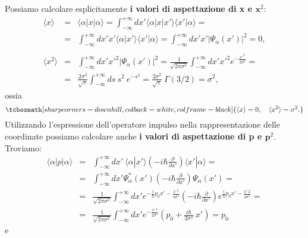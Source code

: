 Possiamo calcolare esplicitamente \textbf{i valori di aspettazione di x e $\mathbf x^2$}:
	\begin{eqnarray}
		\langle x \rangle &=& \langle \alpha | x | \alpha \rangle = \int_{-\infty}^{+\infty} dx' \langle \alpha | x | x' \rangle \langle x' | \alpha \rangle =  \nonumber \\
		&=&  \int_{-\infty}^{+\infty} dx' x' \langle \alpha | x' \rangle \langle x' | \alpha \rangle = \int_{-\infty}^{+\infty} dx' x' |\Psi_\alpha (x')|^2 = 0,\\
		\nonumber \\
		\langle x^2 \rangle &=&  \int_{-\infty}^{+\infty} dx' x'^2 |\Psi_\alpha (x')|^2 = \frac{1}{\sqrt{2 \pi \sigma^2}} \int_{-\infty}^{+\infty} dx' x'^2 e^{- \frac{x'^2}{2 \sigma^2}} =\nonumber  \\
		&=& \frac{2 \sigma^2}{\sqrt{\pi}} \int_{-\infty}^{+\infty} ds ~ s^2 ~e^{-s^2} = \frac{2 \sigma^2}{\sqrt{\pi}} ~ \Gamma(3/2) = \sigma^2,
	\end{eqnarray}
ossia
	\begin{equation}
		\tcboxmath[sharp corners=downhill, colback=white, colframe=black]{
			\langle x \rangle = 0, \quad \langle x^2 \rangle = \sigma^2.
			}
	\end{equation}
Utilizzando l'espressione dell'operatore impulso nella rappresentazione delle coordinate possiamo calcolare anche \textbf{i valori di aspettazione di p e $\mathbf p^2$}. Troviamo:
	\begin{eqnarray}
		\langle \alpha | p | \alpha \rangle  &=&  \int_{-\infty}^{+\infty} dx'\ \langle \alpha | x' \rangle \left(-i \hbar \frac{\partial}{\partial x'} \right) \langle x' | \alpha \rangle = \nonumber\\
		&=& \int_{-\infty}^{+\infty} dx' \Psi ^* _\alpha(x') \left(-i \hbar \frac{\partial}{\partial x'} \right) \Psi_\alpha(x') = \nonumber \\
		&=& \frac{1}{\sqrt{2 \pi \sigma^2}} \int_{-\infty}^{+\infty} dx' e^{-\frac{i}{\hbar}p_0 x' - \frac{x^{\prime \,2}}{4 \sigma^2}} \left(-i \hbar \frac{\partial}{\partial x'} \right) e^{\frac{i}{\hbar}p_0 x' - \frac{x{\prime \,2}}{4 \sigma^2}} = \nonumber \\
		&=& \frac{1}{\sqrt{2 \pi \sigma^2}} \int_{-\infty}^{+\infty} dx'  e^{- \frac{x^{\prime \,2}}{2 \sigma^2}} \left(p_0 + \frac{i \hbar}{2 \sigma^2} ~x' \right) = p_0
	\end{eqnarray}
e
